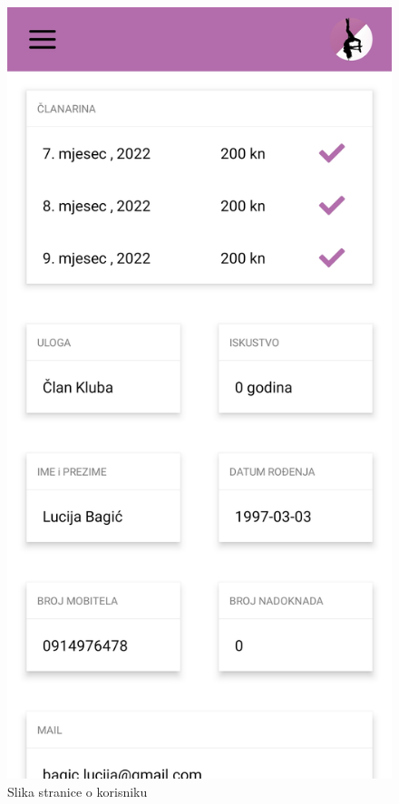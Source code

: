 \documentclass[times, utf8, zavrsni]{fer}
\begin{document}
		    \begin{figure}[H]
        			\includegraphics[scale=0.2]{slike/App_clanarine.jpg}
        			\centering
        			\caption{Slika stranice o korisniku}
        			\label{fig:promjene}
        		\end{figure}
			    
\end{document}
